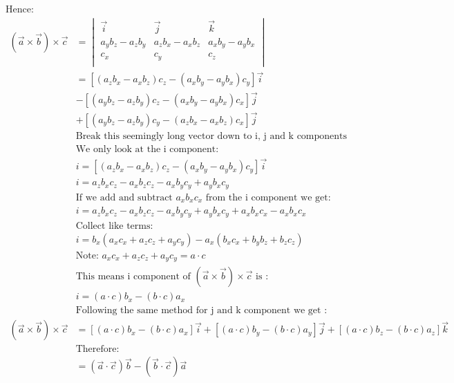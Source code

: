 \documentclass[10pt]{article}
\begin{document}
Hence:
\begin{align*}
\left( \vec{a} \times \vec{b} \right) \times \vec {c} &=
\begin{vmatrix}
  \vec{i} & \vec{j}& \vec{k}\\
  a_yb_z-a_zb_y & a_zb_x-a_xb_z & a_xb_y-a_yb_x \\
  c_x &c_y &c_z \\
\end{vmatrix} \\
&=[(a_zb_x-a_xb_z)c_z-(a_xb_y-a_yb_x)c_y]\vec{i} \\
&-[(a_yb_z-a_zb_y)c_z-(a_xb_y-a_yb_x)c_x]\vec{j} \\ 
&+ [(a_yb_z-a_zb_y)c_y-(a_zb_x-a_xb_z)c_x]\vec{j} \\ 
&\text{Break this seemingly long vector down to i, j and k components} \\
&\text{We only look at the i component:} \\
&i=[(a_zb_x-a_xb_z)c_z-(a_xb_y-a_yb_x)c_y]\vec{i} \\
&i=a_zb_xc_z-a_xb_zc_z-a_xb_yc_y+a_yb_xc_y \\
&\text{If we add and subtract $a_xb_xc_x$ from the i component we get: } \\
&i=a_zb_xc_z-a_xb_zc_z-a_xb_yc_y+a_yb_xc_y+a_xb_xc_x-a_xb_xc_x \\ 
&\text{Collect like terms:} \\
&i=b_x(a_xc_x+a_zc_z+a_yc_y)-a_x(b_xc_x+b_yb_z+b_zc_z)\\
&\text{Note: $a_xc_x+a_zc_z+a_yc_y=a \cdot c$} \\
&\text{This means i component of $\left( \vec{a} \times \vec{b} \right) \times \vec {c}$ is }: \\
&i=(a \cdot c)b_x-(b \cdot c)a_x \\
&\text{Following the same method for j and k component we get :} \\
 \left( \vec{a} \times \vec{b} \right) \times \vec {c} &=[(a \cdot c)b_x-(b \cdot c)a_x] \vec{i}+[(a \cdot c)b_y-(b \cdot c)a_y]\vec{j}+[(a \cdot c)b_z-(b \cdot c)a_z]\vec{k} \\
&\text{Therefore: } \\ 
 &= (\vec{a} \cdot \vec{c})\vec{b}-(\vec{b} \cdot \vec{c})\vec{a}
\end{align*}

\pagebreak 
\end{document}
